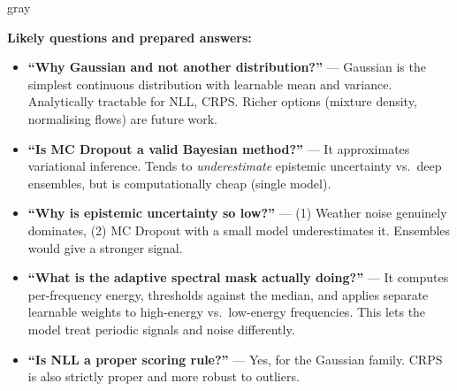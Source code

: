 \documentclass[11pt,a4paper]{article}
\begin{document}
\newpage

\begin{speakerbox}{gray}

\textbf{Likely questions and prepared answers:}
\begin{itemize}[leftmargin=*]
    \item \textbf{``Why Gaussian and not another distribution?''} --- Gaussian is the simplest continuous distribution with learnable mean and variance. Analytically tractable for NLL, CRPS. Richer options (mixture density, normalising flows) are future work.
    \item \textbf{``Is MC Dropout a valid Bayesian method?''} --- It approximates variational inference. Tends to \emph{underestimate} epistemic uncertainty vs.\ deep ensembles, but is computationally cheap (single model).
    \item \textbf{``Why is epistemic uncertainty so low?''} --- (1) Weather noise genuinely dominates, (2) MC Dropout with a small model underestimates it. Ensembles would give a stronger signal.
    \item \textbf{``What is the adaptive spectral mask actually doing?''} --- It computes per-frequency energy, thresholds against the median, and applies separate learnable weights to high-energy vs.\ low-energy frequencies. This lets the model treat periodic signals and noise differently.
    \item \textbf{``Is NLL a proper scoring rule?''} --- Yes, for the Gaussian family. CRPS is also strictly proper and more robust to outliers.
\end{itemize}
\end{speakerbox}

\vspace{6pt}
\end{document}
